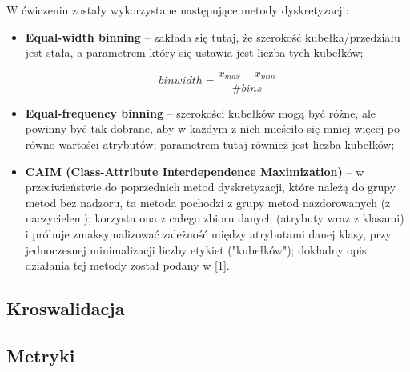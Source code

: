         \noindent
        W ćwiczeniu zostały wykorzystane następujące metody dyskretyzacji:
        \begin{itemize}
            \item{\textbf{Equal-width binning} -- zakłada się tutaj, że szerokość kubełka/przedziału jest stała,
                   a parametrem który się ustawia jest liczba tych kubełków;}

             $$ binwidth = \frac{x_{max} - x_{min}}{\#bins} $$

            \item{\textbf{Equal-frequency binning} -- szerokości kubełków mogą być różne, ale powinny być tak
                  dobrane, aby w każdym z nich mieściło się mniej więcej po równo wartości atrybutów; parametrem
                  tutaj również jest liczba kubełków;}

            \item{\textbf{CAIM (Class-Attribute Interdependence Maximization)} -- w przeciwieństwie do poprzednich
                  metod dyskretyzacji, które należą do grupy metod bez nadzoru, ta metoda pochodzi z grupy metod
                  nazdorowanych (z naczycielem); korzysta ona z całego zbioru danych (atrybuty wraz z klasami) i
                  próbuje zmaksymalizować zależność między atrybutami danej klasy, przy jednoczesnej minimalizacji
                  liczby etykiet ("kubełków"); dokładny opis działania tej metody został podany w [1].}
        \end{itemize}

    \subsection{Kroswalidacja}
    \subsection{Metryki}